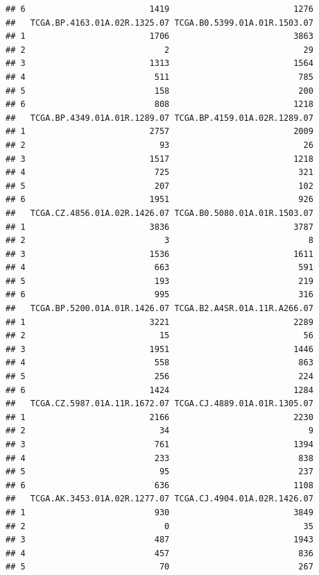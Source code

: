 \documentclass[
]{article}
\begin{document}
\begin{verbatim}
## 6                         1419                         1276
##   TCGA.BP.4163.01A.02R.1325.07 TCGA.B0.5399.01A.01R.1503.07
## 1                         1706                         3863
## 2                            2                           29
## 3                         1313                         1564
## 4                          511                          785
## 5                          158                          200
## 6                          808                         1218
##   TCGA.BP.4349.01A.01R.1289.07 TCGA.BP.4159.01A.02R.1289.07
## 1                         2757                         2009
## 2                           93                           26
## 3                         1517                         1218
## 4                          725                          321
## 5                          207                          102
## 6                         1951                          926
##   TCGA.CZ.4856.01A.02R.1426.07 TCGA.B0.5080.01A.01R.1503.07
## 1                         3836                         3787
## 2                            3                            8
## 3                         1536                         1611
## 4                          663                          591
## 5                          193                          219
## 6                          995                          316
##   TCGA.BP.5200.01A.01R.1426.07 TCGA.B2.A4SR.01A.11R.A266.07
## 1                         3221                         2289
## 2                           15                           56
## 3                         1951                         1446
## 4                          558                          863
## 5                          256                          224
## 6                         1424                         1284
##   TCGA.CZ.5987.01A.11R.1672.07 TCGA.CJ.4889.01A.01R.1305.07
## 1                         2166                         2230
## 2                           34                            9
## 3                          761                         1394
## 4                          233                          838
## 5                           95                          237
## 6                          636                         1108
##   TCGA.AK.3453.01A.02R.1277.07 TCGA.CJ.4904.01A.02R.1426.07
## 1                          930                         3849
## 2                            0                           35
## 3                          487                         1943
## 4                          457                          836
## 5                           70                          267

\end{verbatim}
\end{document}
